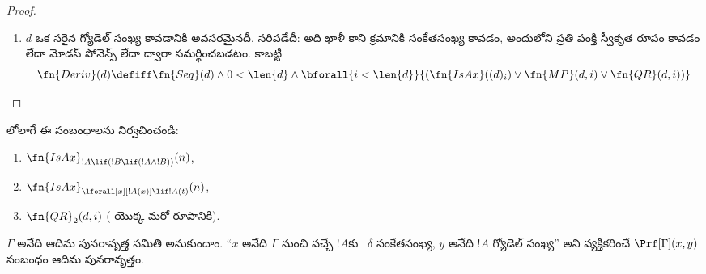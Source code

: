 \documentclass[../../../include/open-logic-section]{subfiles}
\begin{document}
\begin{proof}
\begin{enumerate}
\QR{} నియమపు మరో రూపాన్ని అభ్యాసంగా వదిలేస్తాం.
\item $d$ ఒక సరైన  గ్యోడెల్ సంఖ్య
  కావడానికి అవసరమైనదీ, సరిపడేదీ: అది ఖాళీ కాని క్రమానికి సంకేతసంఖ్య కావడం,
  అందులోని ప్రతి పంక్తి స్వీకృత రూపం కావడం లేదా మోడస్ పోనెన్స్ లేదా
  \QR{} ద్వారా సమర్థించబడటం. కాబట్టి
  \[
  \fn{Deriv}(d)\defiff\fn{Seq}(d)\land 0<\len{d}\land
    \bforall{i<\len{d}}{(\fn{IsAx}((d)_i)\lor
    \fn{MP}(d,i)\lor\fn{QR}(d,i))}
  \]
\end{enumerate}
\end{proof}

\begin{prob}
లోలాగే ఈ సంబంధాలను నిర్వచించండి:
\begin{enumerate}
\item $\fn{IsAx}_{!A\lif(!B\lif(!A\land !B))}(n)$,
\item $\fn{IsAx}_{\lforall[x][!A(x)]\lif !A(t)}(n)$,
\item $\fn{QR}_{2}(d,i)$ (\QR{} యొక్క మరో రూపానికి).
\end{enumerate}
\end{prob}

\begin{prop}
$\Gamma$ అనేది  ఆదిమ పునరావృత్త సమితి
అనుకుందాం. ``$x$ అనేది $\Gamma$ నుంచి వచ్చే $!A$కు
~$\delta$ సంకేతసంఖ్య, $y$ అనేది
$!A$ గ్యోడెల్ సంఖ్య'' అని వ్యక్తీకరించే $\Prf[\Gamma](x,y)$ సంబంధం
ఆదిమ పునరావృత్తం.
\end{prop}
\end{document}
